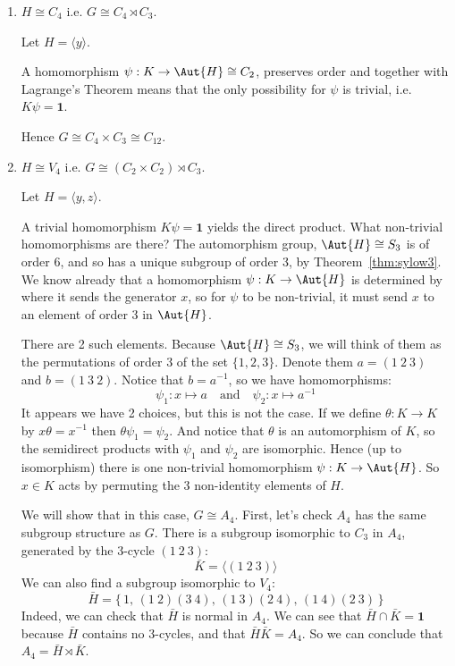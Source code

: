 \begin{enumerate}
    \item \(H \cong C_4\) i.e. \(G \cong C_4 \rtimes C_3\).

        Let \(H = \langle y \rangle\).

        A homomorphism \(\psi:K \to \Aut{H} \cong C_2\), preserves order and together with Lagrange's Theorem means that
        the only possibility for \(\psi\) is trivial, i.e. \(K\psi = \bm{1}\).

        Hence \(G \cong C_4 \times C_3 \cong C_{12}\).

    \item \(H \cong V_4\) i.e. \(G \cong (C_2 \times C_2) \rtimes C_3\).

        Let \(H = \langle y, z \rangle\).

        A trivial homomorphism \(K\psi = \bm{1}\) yields the direct product.
        What non-trivial homomorphisms are there?
        The automorphism group, \(\Aut{H} \cong S_3\) is of order 6, and so has a unique subgroup of order 3, by
        Theorem~\ref{thm:sylow3}.
        We know already that a homomorphism \(\psi: K \to \Aut{H}\) is determined by where it sends the generator
        \(x\), so for \(\psi\) to be non-trivial, it must send \(x\) to an element of order 3 in \(\Aut{H}\).

        There are 2 such elements.
        Because \(\Aut{H} \cong S_3\), we will think of them as the permutations of order 3 of the set \(\{1, 2, 3\}\).
        Denote them \(a = (1\ 2\ 3)\) and \(b = (1\ 3\ 2)\).
        Notice that \(b = a^{-1}\), so we have homomorphisms:
        \[\psi_1:x \mapsto a \quad \text{and} \quad \psi_2:x \mapsto a^{-1}\]
        It appears we have 2 choices, but this is not the case.
        If we define \(\theta:K \to K\) by \(x\theta = x^{-1}\) then \(\theta\psi_1 = \psi_2\).
        And notice that \(\theta\) is an automorphism of \(K\), so the semidirect products with \(\psi_1\) and \(\psi_2\)
        are isomorphic.
        Hence (up to isomorphism) there is one non-trivial homomorphism \(\psi:K \to \Aut{H}\).
        So \(x \in K\) acts by permuting the 3 non-identity elements of \(H\).

        We will show that in this case, \(G \cong A_4\).
        First, let's check \(A_4\) has the same subgroup structure as \(G\).
        There is a subgroup isomorphic to \(C_3\) in \(A_4\), generated by the 3-cycle \((1\ 2\ 3)\):
        \[\bar{K} = \langle (1\ 2\ 3) \rangle\]
        We can also find a subgroup isomorphic to \(V_4\):
        \[\bar{H} = \{\,1,\, (1\ 2)(3\ 4),\, (1\ 3)(2\ 4),\, (1\ 4)(2\ 3)\,\}\]
        Indeed, we can check that \(\bar{H}\) is normal in \(A_4\).
        We can see that \(\bar{H} \cap \bar{K} = \bm{1}\) because \(\bar{H}\) contains no 3-cycles, and that
        \(\bar{H}\bar{K} = A_4\).
        So we can conclude that \(A_4 = \bar{H} \rtimes \bar{K}\).


\end{enumerate}
